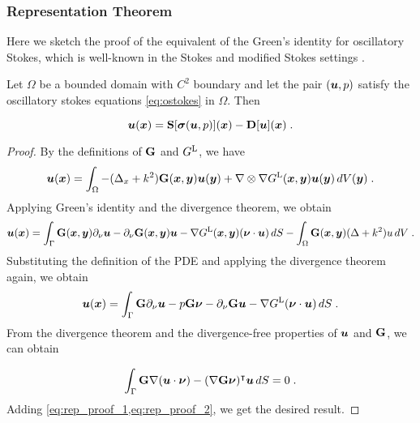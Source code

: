 \subsubsection{Representation Theorem}

Here we sketch the proof of the equivalent of the
Green's identity for oscillatory Stokes, which is well-known
in the Stokes and modified Stokes settings
\cite{Pozrikidis1992,biros2002embedded,ladyzhenskaya1969mathematical}.

\begin{thrm} \label{thrm:rep-theorem}
  Let $\Omega$ be a bounded domain with $C^2$ boundary and let
  the pair $({\boldsymbol u},p)$ satisfy the oscillatory stokes equations
  \cref{eq:ostokes} in $\Omega$. Then

  \begin{equation} \label{eq:rep-theorem}
    {\boldsymbol u}({\boldsymbol x}) = {\bf S} [{\boldsymbol \sigma}({\boldsymbol u},p)]({\boldsymbol x}) - {\bf D}[{\boldsymbol u}]({\boldsymbol x}) \; .
  \end{equation}
\end{thrm}

\begin{proof}
  By the definitions of ${\bf G}$ and $G^{\textrm{L}}$, we have
  \begin{equation*}
    {\boldsymbol u}({\boldsymbol x}) = \int_\Omega -(\Delta_x + k^2) {\bf G}({\boldsymbol x},{\boldsymbol y}) {\boldsymbol u}({\boldsymbol y})
    + \nabla \otimes \nabla G^{\textrm{L}}({\boldsymbol x},{\boldsymbol y}) {\boldsymbol u}({\boldsymbol y}) \, dV({\boldsymbol y}) \; .
  \end{equation*}
  Applying Green's identity and the divergence theorem, we
  obtain
  \begin{equation}
    {\boldsymbol u}({\boldsymbol x}) = \int_\Gamma {\bf G}({\boldsymbol x},{\boldsymbol y}) \partial_\nu {\boldsymbol u}
    - \partial_\nu {\bf G}({\boldsymbol x},{\boldsymbol y}) {\boldsymbol u}
    - \nabla G^{\textrm{L}}({\boldsymbol x},{\boldsymbol y}) ({\boldsymbol \nu} \cdot {\boldsymbol u}) \, dS 
    - \int_\Omega {\bf G}({\boldsymbol x},{\boldsymbol y}) (\Delta + k^2) u \, dV \; .
    \nonumber
  \end{equation}
  Substituting the definition of the PDE and applying the divergence
  theorem again, we obtain
  \begin{equation}
    {\boldsymbol u}({\boldsymbol x}) = \int_\Gamma {\bf G} \partial_\nu {\boldsymbol u} - p {\bf G} {\boldsymbol \nu} - \partial_\nu {\bf G} {\boldsymbol u}
    - \nabla G^{\textrm{L}} ({\boldsymbol \nu} \cdot {\boldsymbol u}) \, dS  \; . \label{eq:rep_proof_1}
  \end{equation}
  From the divergence theorem and the divergence-free properties of
  ${\boldsymbol u}$ and ${\bf G}$, we can obtain

  \begin{equation}
    \int_\Gamma {\bf G} \nabla ({\boldsymbol u} \cdot {\boldsymbol \nu})
    - (\nabla {\bf G} {\boldsymbol \nu})^\intercal {\boldsymbol u} \, dS = 0 \; .  \label{eq:rep_proof_2}
  \end{equation}
  Adding \cref{eq:rep_proof_1,eq:rep_proof_2}, we get the desired
  result.
\end{proof}

